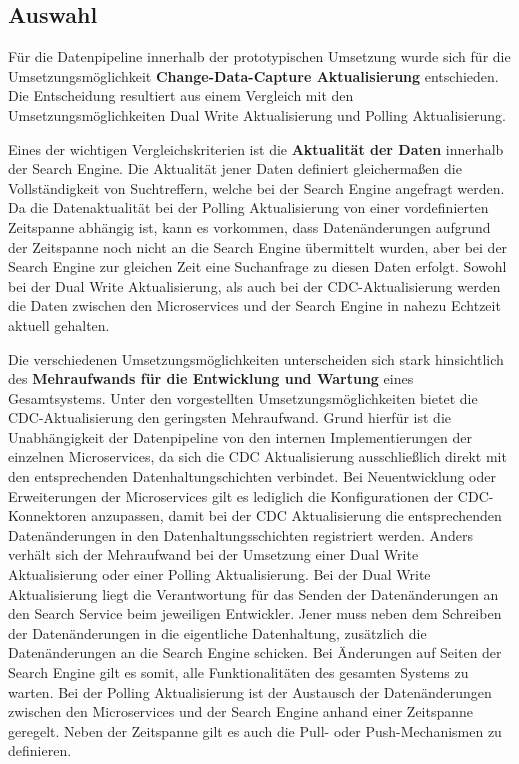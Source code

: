\subsection{Auswahl\label{subsec4.1.5:Unterunterpunkt-5}}

Für die Datenpipeline innerhalb der prototypischen Umsetzung wurde sich für die Umsetzungsmöglichkeit \glqq \textbf{Change-Data-Capture Aktualisierung}\grqq{} entschieden. Die Entscheidung resultiert aus einem Vergleich mit den Umsetzungsmöglichkeiten \glqq Dual Write Aktualisierung\grqq{} und \glqq Polling Aktualisierung\grqq{}.

Eines der wichtigen Vergleichskriterien ist die \textbf{Aktualität der Daten} innerhalb der Search Engine. Die Aktualität jener Daten definiert gleichermaßen die Vollständigkeit von Suchtreffern, welche bei der Search Engine angefragt werden. Da die Datenaktualität bei der Polling Aktualisierung von einer vordefinierten Zeitspanne abhängig ist, kann es vorkommen, dass Datenänderungen aufgrund der Zeitspanne noch nicht an die Search Engine übermittelt wurden, aber bei der Search Engine zur gleichen Zeit eine Suchanfrage zu diesen Daten erfolgt. Sowohl bei der Dual Write Aktualisierung, als auch bei der CDC-Aktualisierung werden die Daten zwischen den Microservices und der Search Engine in nahezu Echtzeit aktuell gehalten.

Die verschiedenen Umsetzungsmöglichkeiten unterscheiden sich stark hinsichtlich des \textbf{Mehraufwands für die Entwicklung und Wartung} eines Gesamtsystems. Unter den vorgestellten Umsetzungsmöglichkeiten bietet die CDC-Aktualisierung den geringsten Mehraufwand. Grund hierfür ist die Unabhängigkeit der Datenpipeline von den internen Implementierungen der einzelnen Microservices, da sich die CDC Aktualisierung ausschließlich direkt mit den entsprechenden Datenhaltungschichten verbindet. Bei Neuentwicklung oder Erweiterungen der Microservices gilt es lediglich die Konfigurationen der CDC-Konnektoren anzupassen, damit bei der CDC Aktualisierung die entsprechenden Datenänderungen in den Datenhaltungsschichten registriert werden. Anders verhält sich der Mehraufwand bei der Umsetzung einer Dual Write Aktualisierung oder einer Polling Aktualisierung. Bei der Dual Write Aktualisierung liegt die Verantwortung für das Senden der Datenänderungen an den Search Service beim jeweiligen Entwickler. Jener muss neben dem Schreiben der Datenänderungen in die eigentliche Datenhaltung, zusätzlich die Datenänderungen an die Search Engine schicken. Bei Änderungen auf Seiten der Search Engine gilt es somit, alle Funktionalitäten des gesamten Systems zu warten. Bei der Polling Aktualisierung ist der Austausch der Datenänderungen zwischen den Microservices und der Search Engine anhand einer Zeitspanne geregelt. Neben der Zeitspanne gilt es auch die Pull- oder Push-Mechanismen zu definieren.

